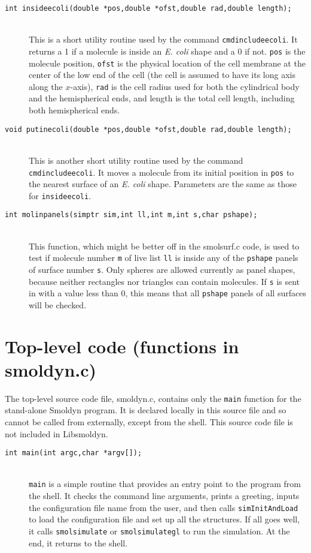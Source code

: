\documentclass {book}
\newcommand {\ttt} {\texttt}
\begin{document}
\begin{description}
\item[\ttt{int insideecoli(double *pos,double *ofst,double rad,double length);}]
\hfill \\
This is a short utility routine used by the command \ttt{cmdincludeecoli}. It returns a 1 if a molecule is inside an \emph{E. coli} shape and a 0 if not. \ttt{pos} is the molecule position, \ttt{ofst} is the physical location of the cell membrane at the center of the low end of the cell (the cell is assumed to have its long axis along the $x$-axis), \ttt{rad} is the cell radius used for both the cylindrical body and the hemispherical ends, and length is the total cell length, including both hemispherical ends.

\item[\ttt{void putinecoli(double *pos,double *ofst,double rad,double length);}]
\hfill \\
This is another short utility routine used by the command \ttt{cmdincludeecoli}. It moves a molecule from its initial position in \ttt{pos} to the nearest surface of an \emph{E. coli} shape. Parameters are the same as those for \ttt{insideecoli}.

\item[\ttt{int molinpanels(simptr sim,int ll,int m,int s,char pshape);}]
\hfill \\
This function, which might be better off in the smolsurf.c code, is used to test if molecule number \ttt{m} of live list \ttt{ll} is inside any of the \ttt{pshape} panels of surface number \ttt{s}. Only spheres are allowed currently as panel shapes, because neither rectangles nor triangles can contain molecules. If \ttt{s} is sent in with a value less than 0, this means that all \ttt{pshape} panels of all surfaces will be checked.

\end{description}

\section{Top-level code (functions in smoldyn.c)}

The top-level source code file, smoldyn.c, contains only the \ttt{main} function for the stand-alone Smoldyn program. It is declared locally in this source file and so cannot be called from externally, except from the shell. This source code file is not included in Libsmoldyn.

\begin{description}

\item[\ttt{int main(int argc,char *argv[]);}]
\hfill \\
\ttt{main} is a simple routine that provides an entry point to the program from the shell. It checks the command line arguments, prints a greeting, inputs the configuration file name from the user, and then calls \ttt{simInitAndLoad} to load the configuration file and set up all the structures. If all goes well, it calls \ttt{smolsimulate} or \ttt{smolsimulategl} to run the simulation. At the end, it returns to the shell.

\end{description}
\end{document}
